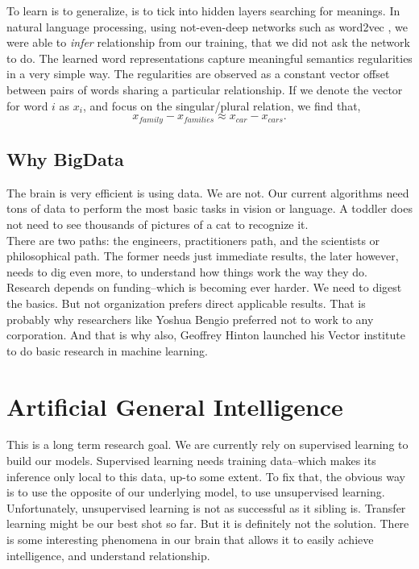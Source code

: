\documentclass[]{article}
\begin{document}
To learn is to generalize, is to tick into hidden layers searching for meanings.
In natural language processing, using not-even-deep networks such as word2vec
\cite{word2vec}, we were able to \textit{infer} relationship from our training,
that we did not ask the network to do. The learned word representations capture
meaningful semantics regularities in a very simple way. The regularities are
observed as a constant vector offset between pairs of words sharing a particular
relationship. If we denote the vector for word $i$ as $x_i$, and focus on the
singular/plural relation, we find that,
\begin{equation*}
  x_{family}-x_{families} \approx x_{car} - x_{cars}.
\end{equation*}

\subsection{Why BigData}
The brain is very efficient is using data. We are not. Our current algorithms
need tons of data to perform the most basic tasks in vision or language. A
toddler does not need to see thousands of pictures of a cat to recognize it.\\

There are two paths: the engineers, practitioners path, and the scientists or
philosophical path. The former needs just immediate results, the later however,
needs to dig even more, to understand how things work the way they do. Research
depends on funding--which is becoming ever harder. We need to digest the
basics. But not organization prefers direct applicable results. That is probably
why researchers like Yoshua Bengio preferred not to work to any corporation. And
that is why also, Geoffrey Hinton launched his Vector institute to do basic
research in machine learning.

\section{Artificial General Intelligence}
This is a long term research goal. We are currently rely on supervised learning
to build our models. Supervised learning needs training data--which makes its
inference only local to this data, up-to some extent. To fix that, the obvious
way is to use the opposite of our underlying model, to use unsupervised
learning. Unfortunately, unsupervised learning is not as successful as it
sibling is. Transfer learning might be our best shot so far. But it is definitely
not the solution. There is some interesting phenomena in our brain that allows
it to easily achieve intelligence, and understand relationship.
\end{document}
